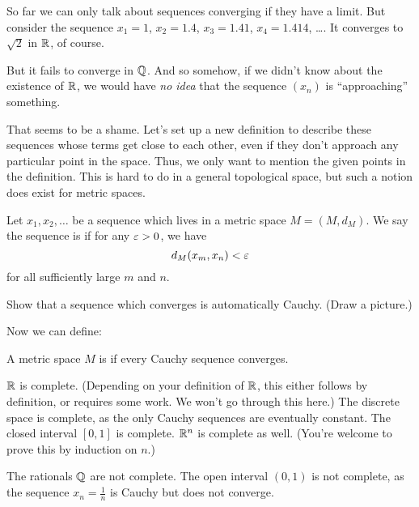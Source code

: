 So far we can only talk about sequences converging if they have a limit.
But consider the sequence $x_1 = 1$, $x_2 = 1.4$, $x_3 = 1.41$, $x_4 = 1.414$, \dots.
It converges to $\sqrt 2$ in $\mathbb R$, of course.

But it fails to converge in $\mathbb Q$.
And so somehow, if we didn't know about the existence of $\mathbb R$, we would
have \emph{no idea} that the sequence $(x_n)$ is ``approaching'' something.

That seems to be a shame.
Let's set up a new definition to describe these sequences whose terms
get close to each other,
even if they don't approach any particular point in the space.
Thus, we only want to mention the given points in the definition.
This is hard to do in a general topological space,
but such a notion does exist for metric spaces.

\begin{definition}
	Let $x_1, x_2, \dots$ be a sequence which lives in a metric space $M = (M,d_M)$.
	We say the sequence is  if for any $\varepsilon > 0$, we have
	\[ d_M(x_m, x_n) < \varepsilon \]
	for all sufficiently large $m$ and $n$.
\end{definition}

\begin{ques}
	Show that a sequence which converges is automatically Cauchy.
	(Draw a picture.)
\end{ques}

Now we can define:
\begin{definition}
	A metric space $M$ is  if every
	Cauchy sequence converges.
\end{definition}

\begin{example}
	\listhack
	\begin{enumerate}[(a)]
		\ii $\mathbb R$ is complete. (Depending on your definition of $\mathbb R$, this either follows
		by definition, or requires some work. We won't go through this here.)
		\ii The discrete space is complete, as the only Cauchy sequences are eventually constant.
		\ii The closed interval $[0,1]$ is complete.
		\ii $\mathbb R^n$ is complete as well. (You're welcome to prove this by induction on $n$.)
	\end{enumerate}
\end{example}
\begin{example}
	\listhack
	\begin{enumerate}[(a)]
		\ii The rationals $\mathbb Q$ are not complete.
		\ii The open interval $(0,1)$ is not complete, as the sequence $x_n = \frac 1n$
		is Cauchy but does not converge.
	\end{enumerate}
\end{example}

